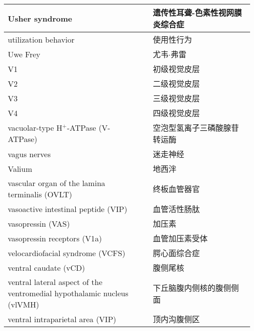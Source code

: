 \begin{longtable}{lll}
	\midrule
	Usher syndrome     &&  遗传性耳聋-色素性视网膜炎综合症  \\
	
	\midrule
	utilization behavior   && 使用性行为  \\
	
	\midrule
	Uwe Frey   && 尤韦$\cdot$弗雷  \\
	
	\midrule
	V1   && 初级视觉皮层  \\
	
	\midrule
	V2   && 二级视觉皮层  \\
	
	\midrule
	V3   && 三级视觉皮层  \\
	
	\midrule
	V4   && 四级视觉皮层  \\
	
	\midrule
	vacuolar-type H$^+$-ATPase (V-ATPase)   && 空泡型氢离子三磷酸腺苷转运酶  \\
	
	\midrule
	vagus nerves   && 迷走神经  \\
	
	\midrule
	Valium   && 地西泮  \\
	
	\midrule
	\makecell[l]{vascular organ of the lamina \\terminalis (OVLT)}   && 终板血管器官  \\
	
	\midrule
	vasoactive intestinal peptide (VIP)  && 血管活性肠肽  \\
	
	\midrule
	vasopressin (VAS)  && 加压素  \\
	
	\midrule
	vasopressin receptors (V1a)  && 血管加压素受体  \\
	
	\midrule
	velocardiofacial syndrome (VCFS)   && 腭心面综合症  \\
	
	\midrule
	ventral caudate (vCD)   && 腹侧尾核  \\
	
	\midrule
	\makecell[l]{ventral lateral aspect of the \\ventromedial hypothalamic nucleus (vlVMH)}   && 下丘脑腹内侧核的腹侧侧面  \\
	
	\midrule
	ventral intraparietal area (VIP)   && 顶内沟腹侧区  \\
	

\end{longtable}
